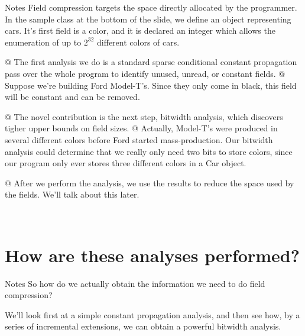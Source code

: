 \documentclass[%
pdf,
colorBG,
slideColor,
nototal,
oqe
]{prosper}
\newenvironment{talknotes}{\begin{slide}{Notes}\tiny}{\end{slide}}
\begin{document}
\begin{talknotes}
Field compression targets the space directly allocated by the
programmer.  In the sample class at the bottom of the slide, we
define an object representing cars.  It's first field is a color,
and it is declared an integer which allows the enumeration of up
to $2^{32}$ different colors of cars.

@ The first analysis we do is a standard sparse conditional constant
propagation pass over the whole program to identify unused, unread,
or constant fields.  @ Suppose we're building Ford Model-T's.
Since they only come in black, this field will be constant and
can be removed.

@ The novel contribution is the next step, bitwidth analysis, which discovers
tigher upper bounds on field sizes.  @  Actually, Model-T's were
produced in several different colors before Ford started
mass-production.  Our bitwidth analysis could determine that
we really only need two bits to store colors, since our program
only ever stores three different colors in a Car object.

@ After we perform the analysis, we use the results to
reduce the space used by the fields.  We'll talk about this later.

~%
\end{talknotes}

\part{How are these analyses performed?}
\begin{talknotes}
So how do we actually obtain the information we need to do field
compression?

We'll look first at a simple constant propagation analysis, and then
see how, by a series of incremental extensions, we can obtain a
powerful bitwidth analysis.

~%
\end{talknotes}
\end{document}
